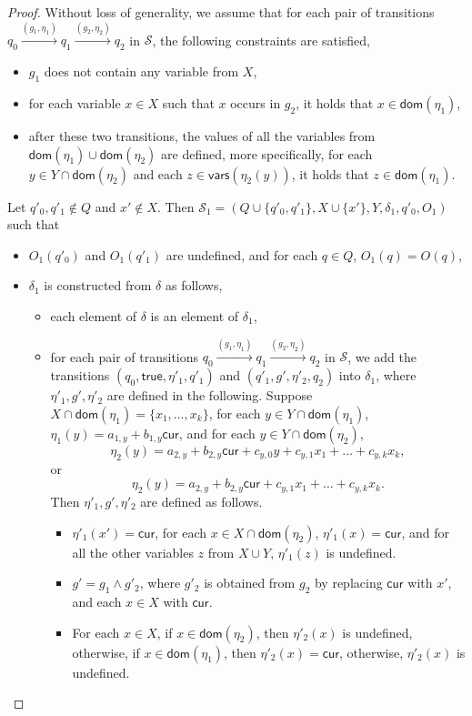 \documentclass[runningheads,a4paper]{llncs}
\def\Ss{{\mathcal{S} }}
\newcommand\cur{\mathsf{cur}}
\newcommand\vars{\mathsf{vars}}
\newcommand\dom{\mathsf{dom}}
\newcommand\ltrue{\mathsf{true}}
\begin{document}
\begin{appendix}
\begin{proof}
Without loss of generality, we assume that for each pair of transitions $q_0 \xrightarrow{(g_1,\eta_1)} q_1 \xrightarrow{(g_2,\eta_2)} q_2$ in $\Ss$, the following constraints are satisfied,
\begin{itemize}
\item $g_1$ does not contain any variable from $X$,
%
\item for each variable $x \in X$ such that $x$ occurs in $g_2$, it holds that $x \in \dom(\eta_1)$,
%
\item after these two transitions, the values of all the variables from $\dom(\eta_1) \cup \dom(\eta_2)$ are defined, more specifically, for each $y \in Y \cap \dom(\eta_2)$ and each $z \in \vars(\eta_2(y))$, it holds that $z \in \dom(\eta_1)$.
\end{itemize}

Let $q'_{0},q'_{1} \not \in Q$ and $x' \not \in X$. Then $\Ss_1 = (Q \cup \{q'_{0},q'_1\}, X \cup \{x'\}, Y, \delta_1, q'_{0}, O_1)$ such that 
\begin{itemize}
\item $O_1(q'_0)$ and $O_1(q'_1)$ are undefined, and for each $q \in Q$, $O_1(q)=O(q)$,
%
\item $\delta_1$ is constructed from $\delta$ as follows,
\begin{itemize}
\item each element of $\delta$ is an element of $\delta_1$,
%
\item for each pair of transitions $q_0 \xrightarrow{(g_1,\eta_1)} q_1 \xrightarrow{(g_2,\eta_2)} q_2$ in $\Ss$, we add the transitions $(q_0, \ltrue, \eta'_1, q'_1)$ and $(q'_1, g', \eta'_2, q_2)$ into $\delta_1$, where $\eta'_1,g',\eta'_2$ are defined in the following. Suppose $X \cap \dom(\eta_1)=\{x_1,\dots,x_k\}$, for each $y \in Y \cap \dom(\eta_1)$, $\eta_1(y)=a_{1,y} + b_{1,y}\cur$, and for each $y \in Y \cap \dom(\eta_2)$, 
\[\eta_2(y)=a_{2,y} + b_{2,y} \cur + c_{y,0} y + c_{y,1} x_1 + \dots + c_{y,k} x_k,\] 
or 
\[
\eta_2(y)=a_{2,y} + b_{2,y} \cur + c_{y,1} x_1 + \dots + c_{y,k} x_k.
\]
Then $\eta'_1, g', \eta'_2$ are defined as follows.
\begin{itemize}
\item $\eta'_1(x')=\cur$, for each $x \in X \cap \dom(\eta_2)$, $\eta'_1(x)=\cur$, and for all the other variables $z$ from $X \cup Y$, $\eta'_1(z)$ is undefined.
%
\item $g' = g_1 \wedge g'_2$, where $g'_2$ is obtained from $g_2$ by replacing $\cur$ with $x'$, and each $x \in X$ with $\cur$.
%
\item For each $x \in X$, if $x \in \dom(\eta_2)$, then $\eta'_2(x)$ is undefined, otherwise, if $x \in \dom(\eta_1)$, then $\eta'_2(x)=\cur$, otherwise, $\eta'_2(x)$ is undefined.

\end{itemize}
\end{itemize}
\end{itemize}
\end{proof}
\end{appendix}
\end{document}
